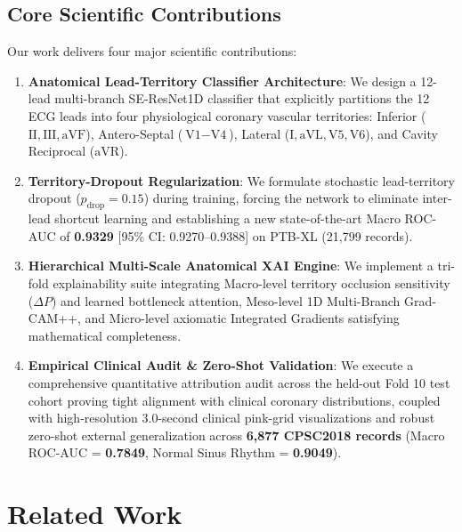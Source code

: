 \documentclass[5p,twocolumn,10pt]{elsarticle}
\begin{document}
\subsection{Core Scientific Contributions}
Our work delivers four major scientific contributions:
\begin{enumerate}
    \item \textbf{Anatomical Lead-Territory Classifier Architecture}: We design a 12-lead multi-branch SE-ResNet1D classifier that explicitly partitions the 12 ECG leads into four physiological coronary vascular territories: Inferior ($\text{II}, \text{III}, \text{aVF}$), Antero-Septal ($\text{V1}-\text{V4}$), Lateral ($\text{I}, \text{aVL}, \text{V5}, \text{V6}$), and Cavity Reciprocal ($\text{aVR}$).
    \item \textbf{Territory-Dropout Regularization}: We formulate stochastic lead-territory dropout ($p_{\text{drop}} = 0.15$) during training, forcing the network to eliminate inter-lead shortcut learning and establishing a new state-of-the-art Macro ROC-AUC of \textbf{0.9329} [95\% CI: 0.9270--0.9388] on PTB-XL (21,799 records).
    \item \textbf{Hierarchical Multi-Scale Anatomical XAI Engine}: We implement a tri-fold explainability suite integrating Macro-level territory occlusion sensitivity ($\Delta P$) and learned bottleneck attention, Meso-level 1D Multi-Branch Grad-CAM++, and Micro-level axiomatic Integrated Gradients satisfying mathematical completeness.
    \item \textbf{Empirical Clinical Audit \& Zero-Shot Validation}: We execute a comprehensive quantitative attribution audit across the held-out Fold 10 test cohort proving tight alignment with clinical coronary distributions, coupled with high-resolution 3.0-second clinical pink-grid visualizations and robust zero-shot external generalization across \textbf{6,877 CPSC2018 records} (Macro ROC-AUC = \textbf{0.7849}, Normal Sinus Rhythm = \textbf{0.9049}).
\end{enumerate}


\section{Related Work}
\label{sec:related}
\end{document}
